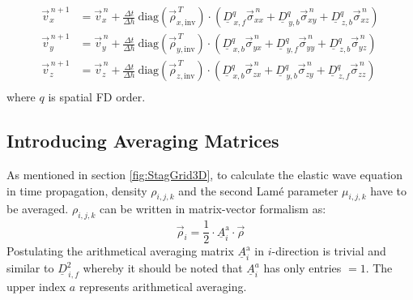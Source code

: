 \documentclass[pdftex,a4paper,parskip,listof=totoc,bibliography=totoc,onehalfspacing,12pt]{scrreprt}
\begin{document}
\begin{align*}
	\vec{v}_x^{\,n+1} &= \vec{v}_x^{\,n} + \frac{\Delta t}{\Delta h} ~ \mathrm{diag} \left( \vec{\rho}_{x,\mathrm{inv}}^{\,T} \right) \cdot \left( \underline{D}_{\,x,f}^q \vec{\sigma}_{xx}^{\,n} + \underline{D}_{\,y,b}^q \vec{\sigma}_{xy}^{\,n} + \underline{D}_{\,z,b}^q \vec{\sigma}_{xz}^{\,n} \right)\\
	\vec{v}_y^{\,n+1} &= \vec{v}_y^{\,n} + \frac{\Delta t}{\Delta h} ~ \mathrm{diag} \left( \vec{\rho}_{y,\mathrm{inv}}^{\,T} \right) \cdot \left( \underline{D}_{\,x,b}^q \vec{\sigma}_{yx}^{\,n} + \underline{D}_{\,y,f}^q \vec{\sigma}_{yy}^{\,n} + \underline{D}_{\,z,b}^q \vec{\sigma}_{yz}^{\,n} \right)\\
	\vec{v}_z^{\,n+1} &= \vec{v}_z^{\,n} + \frac{\Delta t}{\Delta h} ~ \mathrm{diag} \left( \vec{\rho}_{z,\mathrm{inv}}^{\,T} \right) \cdot \left( \underline{D}_{\,x,b}^q \vec{\sigma}_{zx}^{\,n} + \underline{D}_{\,y,b}^q \vec{\sigma}_{zy}^{\,n} + \underline{D}_{\,z,f}^q \vec{\sigma}_{zz}^{\,n} \right)\\
\end{align*}
where $q$ is spatial FD order.

\subsection{Introducing Averaging Matrices} \label{sec:Introducing_Averaging_Matrices}
As mentioned in section \ref{fig:StagGrid3D}, to calculate the elastic wave equation in time propagation, density $\rho_{i,j,k}$ and the second Lam\'{e} parameter $\mu_{i,j,k}$ have to be averaged. $\rho_{i,j,k}$ can be written in matrix-vector formalism as:
\begin{equation*}
\vec{\rho}_{i}=\frac{1}{2}\cdot\underline{A}^{\text{a}}_{i} \cdot\vec{\rho}	
\end{equation*}
Postulating the arithmetical averaging matrix $\underline{A}^{\text{a}}_{i}$ in $i$-direction is trivial and similar to $\underline{D}_{\,i,f}^2$ whereby it should be noted that $\underline{A}^{a}_{i}$ has only entries $=1$. The upper index $a$ represents arithmetical averaging.
\end{document}
